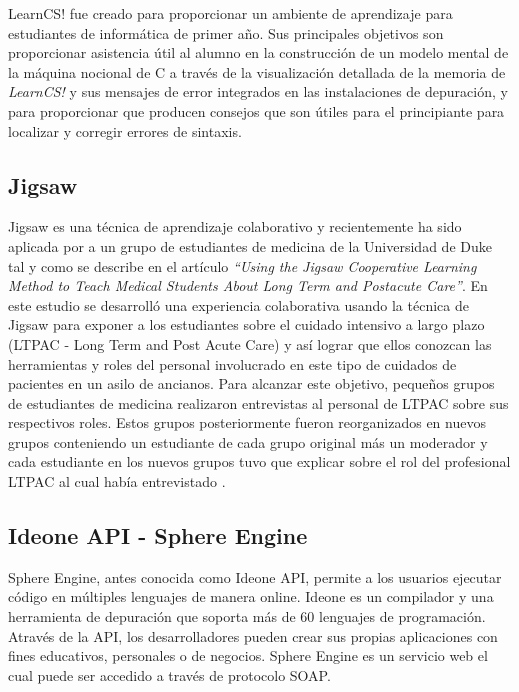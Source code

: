\documentclass[twoside]{article}
\begin{document}
\begin{multicols}{2}
LearnCS! fue creado para proporcionar un ambiente de aprendizaje para estudiantes de informática de primer año. Sus principales objetivos son proporcionar asistencia útil al alumno en la construcción de un modelo mental de la máquina nocional de C a través de la visualización detallada de la memoria de \emph{LearnCS!} y sus mensajes de error integrados en las instalaciones de depuración, y para proporcionar que producen consejos que son útiles para el principiante para localizar y corregir errores de sintaxis\cite{lipman_learncs_2014}.

\subsection*{Jigsaw}
Jigsaw es una técnica de aprendizaje colaborativo y recientemente ha sido aplicada por  a un grupo de estudiantes de medicina  de la Universidad de Duke tal y como se describe en el artículo \emph{``Using the Jigsaw Cooperative Learning Method to Teach Medical Students About Long Term and Postacute Care''}. En este estudio se desarrolló una experiencia colaborativa usando la técnica de Jigsaw para exponer a los estudiantes sobre el cuidado intensivo a largo plazo  (LTPAC - Long Term and Post Acute Care) y así lograr que ellos conozcan las herramientas y roles del personal involucrado en este tipo de cuidados de pacientes en un asilo de ancianos. Para alcanzar este objetivo, pequeños grupos de estudiantes de medicina realizaron entrevistas al personal de LTPAC sobre sus respectivos roles. Estos grupos posteriormente fueron reorganizados en nuevos grupos conteniendo un estudiante de cada grupo original más un moderador y cada estudiante en los nuevos grupos tuvo que explicar sobre el rol del profesional LTPAC al cual había entrevistado \cite{Buhr2014429}.\\

\subsection*{Ideone API - Sphere Engine}
Sphere Engine, antes conocida como Ideone API, permite a los usuarios ejecutar código en múltiples lenguajes de manera online. Ideone es un compilador y una herramienta de depuración que soporta más de 60 lenguajes de programación. Através de la API, los desarrolladores pueden crear sus propias aplicaciones con fines educativos, personales o de negocios. Sphere Engine es un servicio web el cual puede ser accedido a través de protocolo SOAP.\\


\end{multicols}
\end{document}
